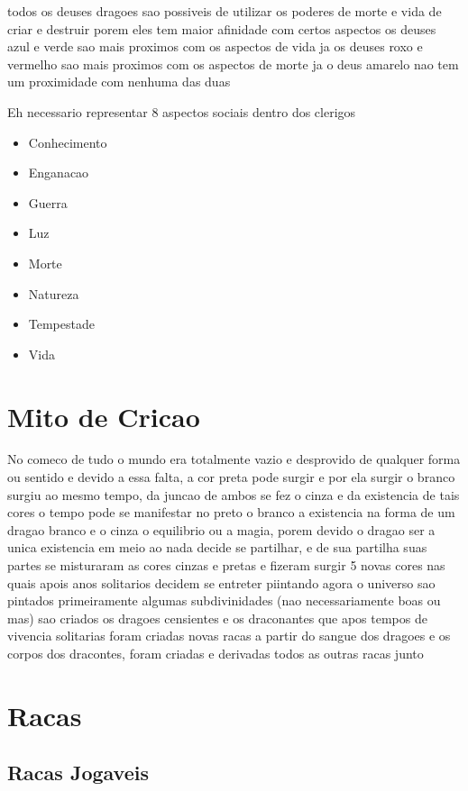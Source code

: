 \documentclass{book}
\begin{document}
todos os deuses dragoes sao possiveis de utilizar os poderes de morte e vida de criar e destruir 
porem eles tem maior afinidade com certos aspectos os deuses azul e verde sao mais proximos com
os aspectos de vida ja os deuses roxo e vermelho sao mais proximos com os aspectos de morte 
ja o deus amarelo nao tem um proximidade com nenhuma das duas 

Eh necessario representar 8 aspectos sociais dentro dos clerigos 
\begin{itemize}
      \item Conhecimento
      \item Enganacao 
      \item Guerra 
      \item Luz 
      \item Morte
      \item Natureza 
      \item Tempestade 
      \item Vida 
\end{itemize}



\chapter{Mito de Cricao}

No comeco de tudo o mundo era totalmente vazio e desprovido de qualquer forma ou sentido e devido
a essa falta, a cor preta pode surgir e por ela surgir o branco surgiu ao mesmo tempo, da juncao 
de ambos se fez o cinza e da existencia de tais cores o tempo pode se manifestar no preto o 
branco a existencia na forma de um dragao branco e o cinza o equilibrio ou a magia, porem devido
o dragao ser a unica existencia em meio ao nada decide se partilhar, e de sua partilha suas 
partes se misturaram as cores cinzas e pretas e fizeram surgir 5 novas cores nas quais apois 
anos solitarios decidem se entreter piintando agora o universo sao pintados primeiramente 
algumas subdivinidades (nao necessariamente boas ou mas) sao criados os dragoes censientes e os 
draconantes que apos tempos de vivencia solitarias foram criadas novas racas a partir do sangue 
dos dragoes e os corpos dos dracontes, foram criadas e derivadas todos as outras racas junto 

\chapter{Racas}
\section{Racas Jogaveis}
\end{document}
